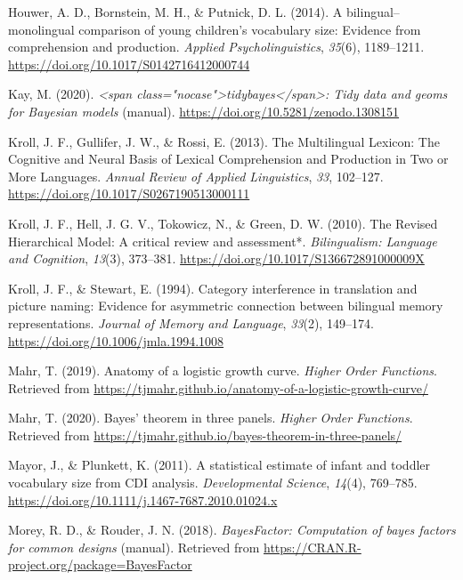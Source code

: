 \documentclass[english,man,man,floatsintext]{apa6}
\begin{document}
\leavevmode\hypertarget{ref-houwer2014}{}%
Houwer, A. D., Bornstein, M. H., \& Putnick, D. L. (2014). A bilingual--monolingual comparison of young children's vocabulary size: Evidence from comprehension and production. \emph{Applied Psycholinguistics}, \emph{35}(6), 1189--1211. \url{https://doi.org/10.1017/S0142716412000744}

\leavevmode\hypertarget{ref-kay2020}{}%
Kay, M. (2020). \emph{\textless{}span class="nocase"\textgreater{}tidybayes\textless{}/span\textgreater{}: Tidy data and geoms for Bayesian models} (manual). \url{https://doi.org/10.5281/zenodo.1308151}

\leavevmode\hypertarget{ref-kroll2013}{}%
Kroll, J. F., Gullifer, J. W., \& Rossi, E. (2013). The Multilingual Lexicon: The Cognitive and Neural Basis of Lexical Comprehension and Production in Two or More Languages. \emph{Annual Review of Applied Linguistics}, \emph{33}, 102--127. \url{https://doi.org/10.1017/S0267190513000111}

\leavevmode\hypertarget{ref-kroll2010}{}%
Kroll, J. F., Hell, J. G. V., Tokowicz, N., \& Green, D. W. (2010). The Revised Hierarchical Model: A critical review and assessment*. \emph{Bilingualism: Language and Cognition}, \emph{13}(3), 373--381. \url{https://doi.org/10.1017/S136672891000009X}

\leavevmode\hypertarget{ref-kroll1994}{}%
Kroll, J. F., \& Stewart, E. (1994). Category interference in translation and picture naming: Evidence for asymmetric connection between bilingual memory representations. \emph{Journal of Memory and Language}, \emph{33}(2), 149--174. \url{https://doi.org/10.1006/jmla.1994.1008}

\leavevmode\hypertarget{ref-mahr2019}{}%
Mahr, T. (2019). Anatomy of a logistic growth curve. \emph{Higher Order Functions}. Retrieved from \url{https://tjmahr.github.io/anatomy-of-a-logistic-growth-curve/}

\leavevmode\hypertarget{ref-mahr2020}{}%
Mahr, T. (2020). Bayes' theorem in three panels. \emph{Higher Order Functions}. Retrieved from \url{https://tjmahr.github.io/bayes-theorem-in-three-panels/}

\leavevmode\hypertarget{ref-mayor2011}{}%
Mayor, J., \& Plunkett, K. (2011). A statistical estimate of infant and toddler vocabulary size from CDI analysis. \emph{Developmental Science}, \emph{14}(4), 769--785. \url{https://doi.org/10.1111/j.1467-7687.2010.01024.x}

\leavevmode\hypertarget{ref-morey2018a}{}%
Morey, R. D., \& Rouder, J. N. (2018). \emph{BayesFactor: Computation of bayes factors for common designs} (manual). Retrieved from \url{https://CRAN.R-project.org/package=BayesFactor}
\end{document}

